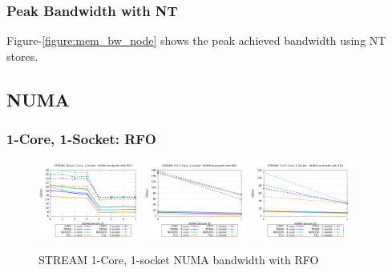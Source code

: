 \documentclass{article}
\begin{document}
\subsubsection{Peak Bandwidth with NT}
Figure-\ref{figure:mem_bw_node} shows the peak achieved bandwidth using NT stores.
\begin{table}[h!]
\centering

\caption{2-socket peak bandwdith: NT}
\label{table:mem_bw_node_nt}
\end{table}



\subsection{NUMA}
\subsubsection{1-Core, 1-Socket: RFO}
\begin{figure}[!ht]
    \centering
    \includegraphics[width=0.3\textwidth]{../mem_bw_numa/Rome_numa_nps4_compact_rfo}
    \includegraphics[width=0.3\textwidth]{../mem_bw_numa/ICX_numa_nps1_compact_rfo}
    \includegraphics[width=0.3\textwidth]{../mem_bw_numa/CLX_numa_nps1_compact_rfo}
    \caption{STREAM 1-Core, 1-socket NUMA bandwidth with RFO}
    \label{figure:mem_bw_numa_rfo}
\end{figure}
\end{document}
